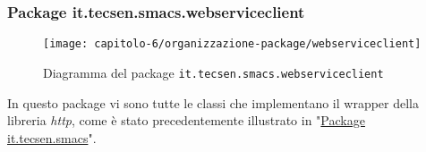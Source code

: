 \subsubsection{Package it.tecsen.smacs.webserviceclient}
\label{subsubsubsec:it-tecsen-smacs-webserviceclient}

\begin{figure}[!h]
  \centering 
  \texttt{[image: capitolo-6/organizzazione-package/webserviceclient]} 
  \caption{Diagramma del package \texttt{it.tecsen.smacs.webserviceclient}}
\end{figure}
In questo package vi sono tutte le classi che implementano il wrapper della libreria \emph{http}, come è stato precedentemente illustrato in "\hyperref[subsubsec:it-tecsen-smacs]{Package it.tecsen.smacs}".
